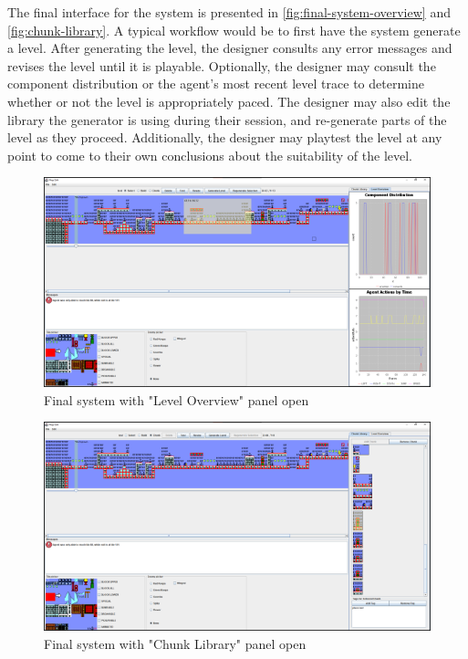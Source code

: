 
The final interface for the system is presented in \autoref{fig:final-system-overview} and
\autoref{fig:chunk-library}. A typical workflow would be to first have the system generate
a level. After generating the level, the designer consults any error messages and revises
the level until it is playable. Optionally, the designer may consult the component distribution
or the agent's most recent level trace to determine whether or not the level is appropriately
paced. The designer may also edit the library the generator is using during their session,
and re-generate parts of the level as they proceed. Additionally, the designer may playtest
the level at any point to come to their own conclusions about the suitability of the level.

\begin{figure}[h]
    \includegraphics[width=\levelwidth]{img/fig14-final-system-overview.png}
    \caption{Final system with "Level Overview" panel open}
    \label{fig:final-system-overview}
\end{figure}

\begin{figure}[h]
    \includegraphics[width=\levelwidth]{img/fig15-chunk-library.png}
    \caption{Final system with "Chunk Library" panel open}
    \label{fig:chunk-library}
\end{figure}